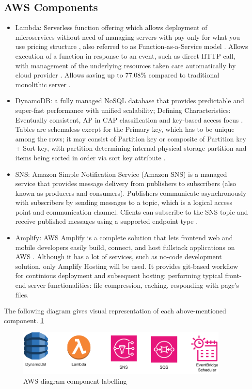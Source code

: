 \subsection{AWS Components}
\begin{itemize}
    \item Lambda: Serverless function offering which allows deployment of microservices without need of managing servers with pay only for what you use pricing structure \cite{LambdaCostSave}, also referred to as Function-as-a-Service model \cite{MALAWSKI2020502}. Allows execution of a function in response to an event, such as direct HTTP call, with management of the underlying resources taken care automatically by cloud provider \cite{MALAWSKI2020502}.  Allows saving up to 77.08\% compared to traditional monolithic server \cite{LambdaCostSave}.
    \item DynamoDB: a fully managed NoSQL database that provides predictable and super-fast performance with unified scalability; Defining Characteristics: Eventually consistent, AP in CAP classification and key-based access focus \cite{DynamoDB}. Tables are schemaless except for the Primary key, which has to be unique among the rows; it may consist of Partition key or composite of Partition key + Sort key, with partition determining internal physical storage partition and items being sorted in order via sort key attribute \cite{awsDynamoWebsite}. 
    \item SNS: Amazon Simple Notification Service (Amazon SNS) is a managed service that provides message delivery from publishers to subscribers (also known as producers and consumers). Publishers communicate asynchronously with subscribers by sending messages to a topic, which is a logical access point and communication channel. Clients can subscribe to the SNS topic and receive published messages using a supported endpoint type \cite{sns}. 
    \item Amplify: AWS Amplify is a complete solution that lets frontend web and mobile developers easily build, connect, and host fullstack applications on AWS \cite{amplify}. Although it has a lot of services, such as no-code development solution, only Amplify Hosting will be used. It provides git-based workflow for continious deployment and subsequent hosting: performing typical front-end server functionalities: file compression, caching, responding with page's files. 
\end{itemize}
The following diagram gives visual representation of each above-mentioned component. \ref{fig:awsComponents}
\begin{figure}
    
    \centering
    \includegraphics[width=0.95\textwidth,keepaspectratio]{../images/AWS_components.pdf}
    \caption{AWS diagram component labelling}
    \label{fig:awsComponents}
\end{figure}
